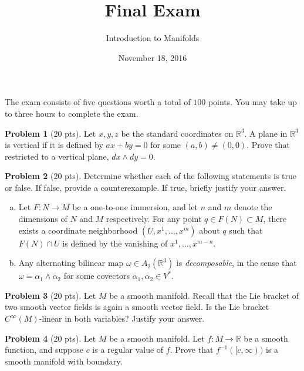 \documentclass{amsart}
\newcommand{\+}[1]{\ensuremath{\mathbf{#1}}}
\newcommand{\R}{{\mathbb R}}
\theoremstyle{definition}
\newtheorem{prob}{Problem}
\begin{document}
\title{Final Exam}
\date{November 18, 2016}
\author{Introduction to Manifolds}

\maketitle


The exam consists of five questions  worth a total of $100$ points.
You may take up to three hours to complete the exam.


\begin{prob}[$20$ pts]
 Let $x,y,z$ be the standard coordinates on $\R^3$.  A plane in $\R^3$
 is vertical if it is defined by 
 $ax + by = 0$ for some $(a,b) \neq (0,0)$.
 Prove that restricted to a vertical plane,
 $dx \wedge dy = 0$.
\end{prob}


\begin{prob}[$20$ pts]
Determine whether each of the following statements is true or false.  If false, provide a counterexample.  If true, briefly justify your answer.
\begin{enumerate}[(a)]
 \item Let $F: N \to M$ be a one-to-one immersion, and let $n$ and $m$ denote the dimensions of $N$ and $M$ respectively.
 For any point $q \in F(N) \subset M$, there exists a coordinate neighborhood $(U, x^1, \ldots, x^m)$ about $q$ such that
 $F(N) \cap U$ is defined by the vanishing of $x^1, \ldots, x^{m-n}$.
 \item Any alternating bilinear map $\omega \in A_2(\R^3)$ is \emph{decomposable}, 
 in the sense that $\omega = \alpha_1 \wedge \alpha_2$ for some
 covectors $\alpha_1, \alpha_2 \in V^*$.
\end{enumerate}
\end{prob}





\begin{prob}[$20$ pts]
Let $M$ be a smooth manifold.  Recall
that the Lie bracket of two smooth vector fields is
again a smooth vector field.  Is the Lie bracket $C^{\infty}(M)$-linear in both variables?  Justify your answer.
\end{prob}





\begin{prob}[$20$ pts]
Let $M$ be a smooth manifold.  Let $f: M \to \R$ be a smooth function, and
suppose $c$ is a regular value of $f$.
Prove that $f^{-1}([c,\infty))$ is a smooth manifold with boundary. 
\end{prob}
\end{document}
